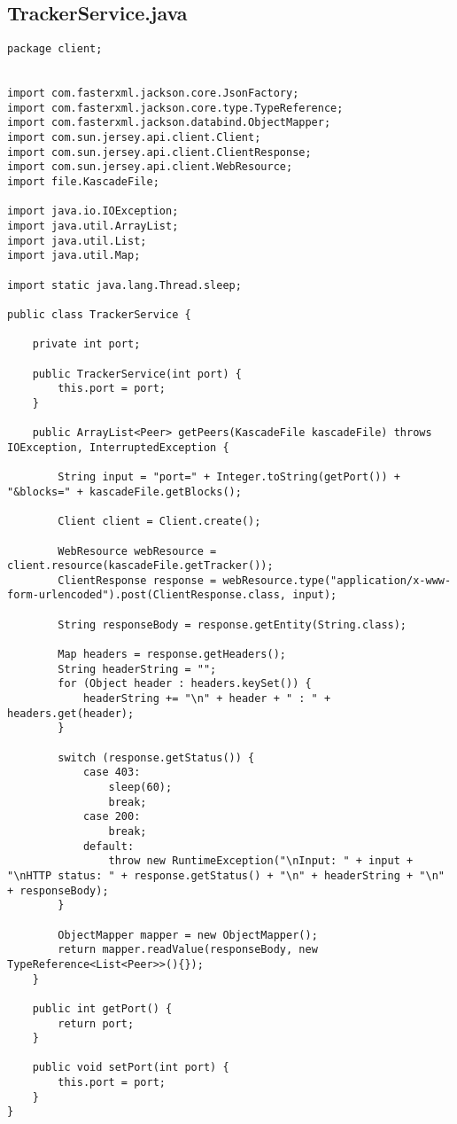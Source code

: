 \documentclass{acm_proc_article-sp}
\begin{document}
\subsection{TrackerService.java}
\begin{lstlisting}
package client;


import com.fasterxml.jackson.core.JsonFactory;
import com.fasterxml.jackson.core.type.TypeReference;
import com.fasterxml.jackson.databind.ObjectMapper;
import com.sun.jersey.api.client.Client;
import com.sun.jersey.api.client.ClientResponse;
import com.sun.jersey.api.client.WebResource;
import file.KascadeFile;

import java.io.IOException;
import java.util.ArrayList;
import java.util.List;
import java.util.Map;

import static java.lang.Thread.sleep;

public class TrackerService {

    private int port;

    public TrackerService(int port) {
        this.port = port;
    }

    public ArrayList<Peer> getPeers(KascadeFile kascadeFile) throws IOException, InterruptedException {

        String input = "port=" + Integer.toString(getPort()) + "&blocks=" + kascadeFile.getBlocks();

        Client client = Client.create();

        WebResource webResource = client.resource(kascadeFile.getTracker());
        ClientResponse response = webResource.type("application/x-www-form-urlencoded").post(ClientResponse.class, input);

        String responseBody = response.getEntity(String.class);

        Map headers = response.getHeaders();
        String headerString = "";
        for (Object header : headers.keySet()) {
            headerString += "\n" + header + " : " + headers.get(header);
        }

        switch (response.getStatus()) {
            case 403:
                sleep(60);
                break;
            case 200:
                break;
            default:
                throw new RuntimeException("\nInput: " + input + "\nHTTP status: " + response.getStatus() + "\n" + headerString + "\n" + responseBody);
        }

        ObjectMapper mapper = new ObjectMapper();
        return mapper.readValue(responseBody, new TypeReference<List<Peer>>(){});
    }

    public int getPort() {
        return port;
    }

    public void setPort(int port) {
        this.port = port;
    }
}
\end{lstlisting}
\end{document}
